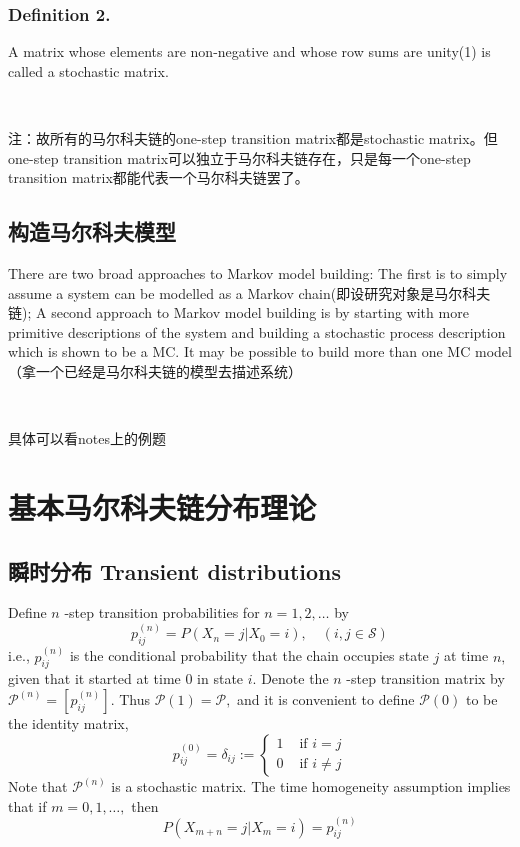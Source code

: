 \documentclass[UTF8]{ctexart}
\begin{document}
\subsubsection{Definition 2.} A matrix whose elements are non-negative and whose row sums are unity(1) is called a
stochastic matrix.

\

注：故所有的马尔科夫链的one-step transition matrix都是stochastic matrix。但one-step transition matrix可以独立于马尔科夫链存在，只是每一个one-step transition matrix都能代表一个马尔科夫链罢了。

\subsection{构造马尔科夫模型}

There are two broad approaches to Markov model building: The first is to simply assume a system can be modelled as a Markov chain(即设研究对象是马尔科夫链); A second approach to Markov model building is by starting with more primitive descriptions of the system and building a stochastic process description which is shown to be a MC. It may be possible to build more than one MC model（拿一个已经是马尔科夫链的模型去描述系统）

\

具体可以看notes上的例题

\section{基本马尔科夫链分布理论}

\subsection{瞬时分布 Transient distributions} Define $n$ -step transition probabilities for $n=1,2, \ldots$ by
$$
p_{i j}^{(n)}=P\left(X_{n}=j | X_{0}=i\right), \quad(i, j \in \mathcal{S})
$$
i.e., $p_{i j}^{(n)}$ is the conditional probability that the chain occupies state $j$ at time $n,$ given that it started at time 0 in state $i .$ Denote the $n$ -step transition matrix by $\mathcal{P}^{(n)}=\left[p_{i j}^{(n)}\right] .$ Thus $\mathcal{P}(1)=\mathcal{P},$ and it is convenient to define $\mathcal{P}(0)$ to be the identity matrix,
$$
p_{i j}^{(0)}=\delta_{i j}:=\left\{\begin{array}{ll}
1 & \text { if } i=j \\
0 & \text { if } i \neq j
\end{array}\right.
$$
Note that $\mathcal{P}^{(n)}$ is a stochastic matrix. The time homogeneity assumption implies that if $m=0,1, \ldots,$ then
$$
P\left(X_{m+n}=j | X_{m}=i\right)=p_{i j}^{(n)}
$$
\end{document}

